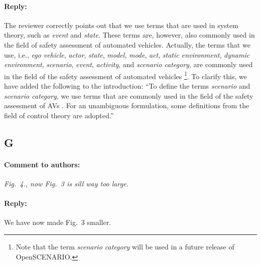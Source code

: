 \documentclass[10pt,final,a4paper,oneside,onecolumn]{article}
\newcommand{\toauthornew}{\paragraph*{Comment to authors:} \itshape}
\newcommand{\fromauthornew}{\paragraph*{Reply:} \normalfont}
\newcommand{\cstart}{\cbstart\color{red}}
\newcommand{\cend}{\cbend\color{black}}
\begin{document}
\fromauthornew The reviewer correctly points out that we use terms that are used in system theory, such as \emph{event} and \emph{state}. These terms are, however, also commonly used in the field of safety assessment of automated vehicles. Actually, the terms that we use, i.e., \emph{ego vehicle}, \emph{actor}, \emph{state}, \emph{model}, \emph{mode}, \emph{act}, \emph{static environment}, \emph{dynamic environment}, \emph{scenario}, \emph{event}, \emph{activity}, and \emph{scenario category}, are commonly used in the field of the safety assessment of automated vehicles \autocite{catapult2018musicc,catapult2018regulating,sigsim2019glossary,openscenario,ulbrich2015,geyer2014}\footnote{Note that the term \emph{scenario category} will be used in a future release of OpenSCENARIO.}. To clarify this, we have added the following to the introduction: ``\cstart To define the terms \emph{scenario} and \emph{scenario category}, we use terms that are commonly used in the field of the safety assessment of AVs \autocite{catapult2018musicc,catapult2018regulating,sigsim2019glossary,openscenario,ulbrich2015,geyer2014}. For an unambiguous formulation, some definitions from the field of control theory are adopted.\cend''



\subsection*{G}

\toauthornew Fig.\ 4., now Fig.\ 3 is sill way too large. 

\fromauthornew We have now made Fig.\ 3 smaller.




\printbibliography
\end{document}
